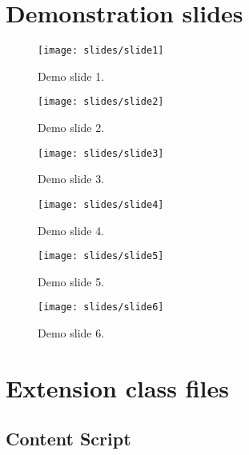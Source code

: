 \chapter{Demonstration slides}\label{demo-slides}

\begin{figure}
    \texttt{[image: slides/slide1]}
    \caption{Demo slide 1.}
    \label{slide1}
\end{figure}


\begin{figure}
    \texttt{[image: slides/slide2]}
    \caption{Demo slide 2.}
    \label{slide2}
\end{figure}


\begin{figure}
    \texttt{[image: slides/slide3]}
    \caption{Demo slide 3.}
    \label{slide3}
\end{figure}


\begin{figure}
    \texttt{[image: slides/slide4]}
    \caption{Demo slide 4.}
    \label{slide4}
\end{figure}

\begin{figure}
    \texttt{[image: slides/slide5]}
    \caption{Demo slide 5.}
    \label{slide5}
\end{figure}


\begin{figure}
    \texttt{[image: slides/slide6]}
    \caption{Demo slide 6.}
    \label{slide6}
\end{figure}

\cleardoublepage
\chapter{Extension class files}\label{extension-classes}

\section{Content Script}\label{app:content-script}


